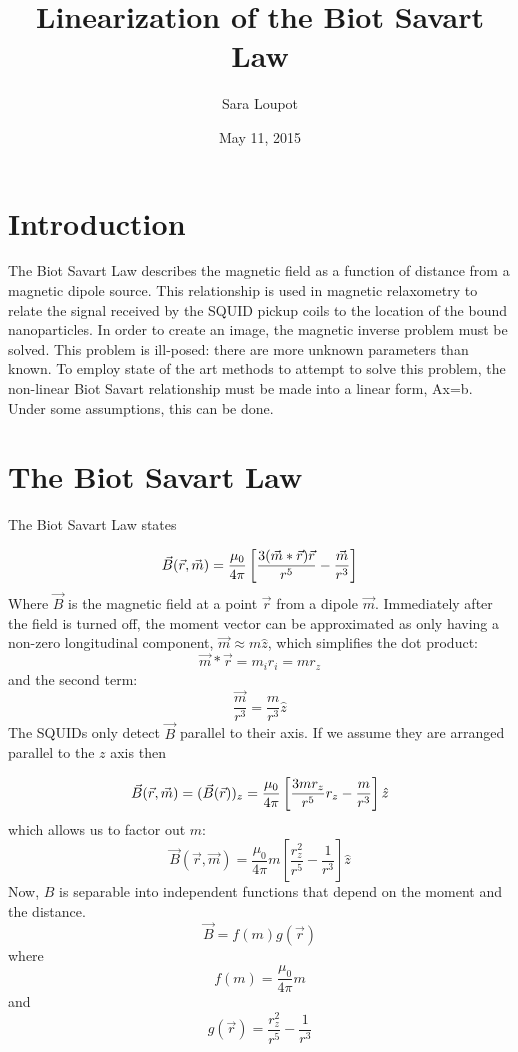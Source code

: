 \documentclass[a4paper]{article}
\title{Linearization of the Biot Savart Law}
\author{Sara Loupot}
\date{May 11, 2015}
\begin{document}
\maketitle
\section{Introduction}
The Biot Savart Law describes the magnetic field as a function of distance from a magnetic dipole source.    This relationship is used in magnetic relaxometry to relate the signal received by the SQUID pickup coils to the location of the bound nanoparticles.  In order to create an image, the magnetic inverse problem must be solved.  This problem is ill-posed: there are more unknown parameters than known.  To employ state of the art methods to attempt to solve this problem, the non-linear Biot Savart relationship must be made into a linear form, Ax=b.  Under some assumptions, this can be done.

\section{The Biot Savart Law}
The Biot Savart Law states

\begin{equation}
\centering
  \vec{B}(\vec{r},\vec{m}) = \frac{\mu_{0}}{4\pi}
    \left[
      \frac{3(\vec{m}*\vec{r})\vec{r}}{r^{5}}-\frac{\vec{m}}{r^{3}}
    \right]
  \label{eq:BiotSavart}
\end{equation}
Where $\vec{B}$ is the magnetic field at a point $\vec{r}$ from a dipole
$\vec{m}$.  Immediately after the field is turned off, the moment vector can
be approximated as only having a non-zero longitudinal component, $\vec{m}
\approx m\hat{z}$, which simplifies the dot product:
\[\vec{m}*\vec{r}= m_{i}r_{i} = m r_{z}\]
and the second term:
\[\frac{\vec{m}}{r^{3}} = \frac{m }{r^{3}}\hat{z}\]
The SQUIDs only detect $\vec{B}$ parallel to their axis.  If we assume they are arranged parallel to the $z$ axis then

\begin{equation}
\centering
\vec{B}(\vec{r},\vec{m}) = (\vec{B}(\vec{r}))_{z} = \frac{\mu_{0}}{4\pi}
    \left[\frac{3m r_{z}}{r^{5}}r_{z} - \frac{m }{r^{3}}
    \right]\hat{z}
\end{equation}
which allows us to factor out $m $:
\begin{equation}
\vec{B}(\vec{r},\vec{m})=\frac{\mu_{0}}{4\pi}m [\frac{r_{z}^{2}}{r^{5}}-\frac{1}{r^{3}}]\hat{z}
\end{equation}
Now, $B$ is separable into  independent functions that depend on the moment
and the distance.
\begin{equation}
\vec{B} = f(m )g(\vec{r}) 
\end{equation}
where 
\begin{equation}
f(m ) = \frac{\mu_{0}}{4\pi}m 
\end{equation}
and 
\begin{equation} \label{eq:g}
g(\vec{r})=\frac{r_{z}^{2}}{r^{5}}-\frac{1}{r^{3}}
\end{equation}
\end{document}
